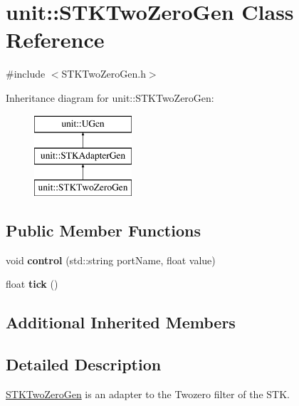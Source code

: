 \hypertarget{classunit_1_1STKTwoZeroGen}{\section{unit\-:\-:S\-T\-K\-Two\-Zero\-Gen Class Reference}
\label{classunit_1_1STKTwoZeroGen}
}


{\ttfamily \#include $<$S\-T\-K\-Two\-Zero\-Gen.\-h$>$}

Inheritance diagram for unit\-:\-:S\-T\-K\-Two\-Zero\-Gen\-:\begin{figure}[H]
\begin{center}
\leavevmode
\includegraphics[height=3.000000cm]{classunit_1_1STKTwoZeroGen}
\end{center}
\end{figure}
\subsection*{Public Member Functions}
\begin{DoxyCompactItemize}
\item 
\hypertarget{classunit_1_1STKTwoZeroGen_a35f0458e31142985a3f35b603ff90e62}{void {\bfseries control} (std\-::string port\-Name, float value)}\label{classunit_1_1STKTwoZeroGen_a35f0458e31142985a3f35b603ff90e62}

\item 
\hypertarget{classunit_1_1STKTwoZeroGen_a1e9392a2e8dc67862de802e914acbf33}{float {\bfseries tick} ()}\label{classunit_1_1STKTwoZeroGen_a1e9392a2e8dc67862de802e914acbf33}

\end{DoxyCompactItemize}
\subsection*{Additional Inherited Members}


\subsection{Detailed Description}
\hyperlink{classunit_1_1STKTwoZeroGen}{S\-T\-K\-Two\-Zero\-Gen} is an adapter to the Twozero filter of the S\-T\-K.

